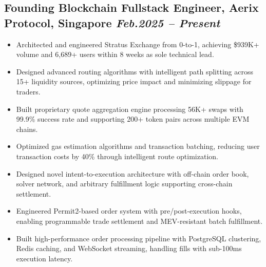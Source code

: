 \documentclass[11pt,a4paper]{article}
\newcommand{\resumeItem}[1]{\item\small{#1}}
\begin{document}
\subsection{Founding Blockchain Fullstack Engineer, Aerix Protocol, Singapore \hfill \textit{Feb.2025 -- Present}}
\begin{itemize}[leftmargin=*, itemsep=1pt, parsep=0pt]
    \resumeItem{Architected and engineered Stratus Exchange from 0-to-1, achieving \$939K+ volume and 6,689+ users within 8 weeks as sole technical lead.}
    \resumeItem{Designed advanced routing algorithms with intelligent path splitting across 15+ liquidity sources, optimizing price impact and minimizing slippage for traders.}
    \resumeItem{Built proprietary quote aggregation engine processing 56K+ swaps with 99.9\% success rate and supporting 200+ token pairs across multiple EVM chains.}
    \resumeItem{Optimized gas estimation algorithms and transaction batching, reducing user transaction costs by 40\% through
intelligent route optimization.}
    \resumeItem{Designed novel intent-to-execution architecture with off-chain order book, solver network, and arbitrary fulfillment logic supporting cross-chain settlement.}
    \resumeItem{Engineered Permit2-based order system with pre/post-execution hooks, enabling programmable trade settlement and MEV-resistant batch fulfillment.}
    \resumeItem{Built high-performance order processing pipeline with PostgreSQL clustering, Redis caching, and WebSocket streaming, handling fills with sub-100ms execution latency.}

\end{itemize}
\end{document}
